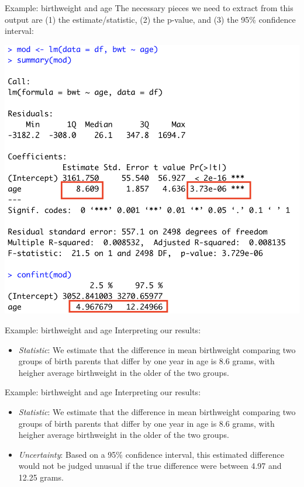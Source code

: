 \documentclass[10pt,t]{beamer}
\begin{document}
\begin{frame}{Example: birthweight and age}
The necessary pieces we need to extract from this output are (1) the estimate/statistic, (2) the p-value, and (3) the 95\% confidence interval:

\vspace{0.15cm}

\centering \includegraphics[scale=0.35]{lm_bwt_age2.png}

\end{frame}

\begin{frame}{Example: birthweight and age}
Interpreting our results:
\begin{itemize}
	\item \textit{Statistic}: We estimate that the difference in mean birthweight comparing two groups of birth parents that differ by one year in age is 8.6 grams, with heigher average birthweight in the older of the two groups.
\end{itemize}
\end{frame}

\begin{frame}{Example: birthweight and age}
Interpreting our results:
\begin{itemize}
	\item \textit{Statistic}: We estimate that the difference in mean birthweight comparing two groups of birth parents that differ by one year in age is 8.6 grams, with heigher average birthweight in the older of the two groups.
	\item \textit{Uncertainty}: Based on a 95\% confidence interval, this estimated difference would not be judged unusual if the true difference were between 4.97 and 12.25 grams.
\end{itemize}
\end{frame}
\end{document}
